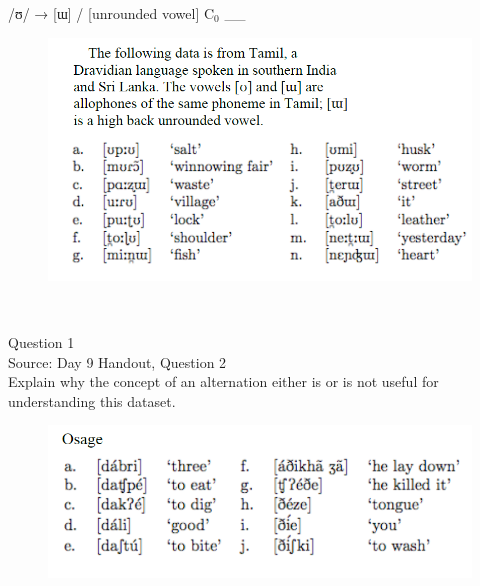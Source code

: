 \documentclass[12pt]{article}
\begin{document}
/ʊ/ → {[ɯ]} / {[unrounded vowel]} C$_0$ \_\_

\begin{figure}[H]
\includegraphics{../images/tamil.png}
\end{figure}

\newpage

\begin{center}
\textbf{{\color{red}{\HUGE END OF EXAM}}}\\

\end{center}
\newpage

\begin{center}
\textbf{{\color{blue}{\HUGE START OF EXAM\\}}}

\textbf{{\color{blue}{\HUGE Student ID: 2358\\}}}

\textbf{{\color{blue}{\HUGE 4:00 - 4:20 PM\\}}}

\end{center}
\newpage

{\large Question 1}\\

Source: Day 9 Handout, Question 2\\

Explain why the concept of an alternation either is or is not useful for understanding this dataset.\\

\begin{figure}[H]
\includegraphics{../images/osage.png}
\end{figure}
\end{document}
